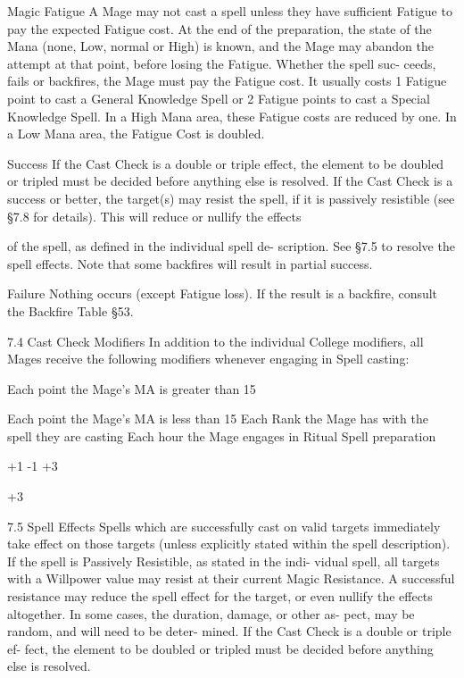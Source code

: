 \begin{Chapter}{Magic}
Fatigue  A  Mage  may  not  cast  a  spell  unless  they 
have sufficient Fatigue to pay the expected Fatigue 
cost. At the end of the preparation, the state of the 
Mana  (none,  Low,  normal  or  High)  is  known,  and 
the  Mage  may  abandon  the  attempt  at  that  point, 
before  losing  the  Fatigue.  Whether  the  spell  suc-
ceeds,  fails  or  backfires,  the  Mage  must  pay  the 
Fatigue cost. It usually costs 1 Fatigue point to cast 
a  General  Knowledge  Spell  or  2  Fatigue  points  to 
cast  a  Special  Knowledge  Spell.  In  a  High  Mana 
area,  these  Fatigue  costs  are  reduced  by  one.  In  a 
Low Mana area, the Fatigue Cost is doubled. 

Success  If  the  Cast  Check  is  a  double  or  triple 
effect, the element to be doubled or tripled must be 
decided  before  anything  else  is  resolved.  If  the 
Cast Check is a success or better, the target(s) may 
resist the spell, if it is passively resistible (see §7.8 
for  details).  This  will  reduce  or  nullify  the  effects 

of  the  spell,  as  defined  in  the  individual  spell  de-
scription. See §7.5 to resolve the spell effects. Note 
that some backfires will result in partial success. 

Failure  Nothing  occurs  (except  Fatigue  loss).  If 
the  result  is  a backfire,  consult  the  Backfire  Table 
§53. 

7.4 Cast Check Modifiers 
In addition to the individual College  modifiers, all 
Mages  receive  the  following  modifiers  whenever 
engaging in Spell casting: 

Each point the Mage’s MA is greater than 15 

Each point the Mage’s MA is less than 15 
Each Rank the Mage has with the spell they 
are casting 
Each hour the Mage engages in Ritual Spell 
preparation 

 
+1 
-1 
+3 

+3 

7.5 Spell Effects 
Spells  which  are  successfully  cast  on  valid  targets 
immediately  take  effect  on  those  targets  (unless 
explicitly stated within the spell description). If the 
spell  is  Passively  Resistible,  as  stated  in  the  indi-
vidual  spell,  all  targets  with  a  Willpower  value 
may  resist  at  their  current  Magic  Resistance.  A 
successful  resistance  may  reduce  the  spell  effect 
for the target, or even nullify the effects altogether. 
In  some  cases,  the  duration,  damage,  or  other  as-
pect,  may  be  random,  and  will  need  to  be  deter-
mined.  If  the  Cast  Check  is  a  double  or  triple  ef-
fect,  the  element  to  be  doubled  or  tripled  must  be 
decided before anything else is resolved. 


\end{Chapter}
